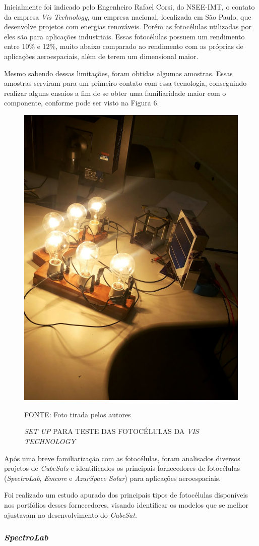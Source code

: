 \documentclass[
	12pt,				%
	openright,			%
	oneside,			%
	a4paper,			%
	english,			%
	french,				%
	spanish,			%
	brazil,				%
	oldfontcommands
	]{abntex2}
\begin{document}
	Inicialmente foi indicado pelo Engenheiro Rafael Corsi, do NSEE-IMT, o contato da empresa \textit{Vis Technology}, um empresa nacional, localizada em São Paulo, que desenvolve projetos com energias renováveis. Porém as fotocélulas utilizadas por eles são para aplicações industriais. Essas fotocélulas possuem um rendimento entre 10\% e 12\%, muito abaixo comparado ao rendimento com as próprias de aplicações aeroespaciais, além de terem um dimensional maior.
	
	Mesmo sabendo dessas limitações, foram obtidas algumas amostras. Essas amostras serviram para um primeiro contato com essa tecnologia, conseguindo realizar alguns ensaios a fim de se obter uma familiaridade maior com o componente, conforme pode ser visto na Figura 6.
	
	\begin{figure}[th]
		\caption{\textit{SET UP} PARA TESTE DAS FOTOCÉLULAS DA \textit{VIS TECHNOLOGY}}
		\centering
		\includegraphics[width=0.3\linewidth]{./figs/setup}
			
		\begin{small}
			FONTE: Foto tirada pelos autores
		\end{small}		
	\end{figure}
	
	Após uma breve familiarização com as fotocélulas, foram analisados diversos projetos de \textit{CubeSats} e identificados os principais fornecedores de fotocélulas (\textit{SpectroLab}, \textit{Emcore} e \textit{AzurSpace Solar}) para aplicações aeroespaciais.
	
	Foi realizado um estudo apurado dos principais tipos de fotocélulas disponíveis nos portfólios desses fornecedores, visando identificar os modelos que se melhor ajustavam no desenvolvimento do \textit{CubeSat}.
	
\subsubsection[SpectroLab]{\textit{SpectroLab}}
	
\end{document}
